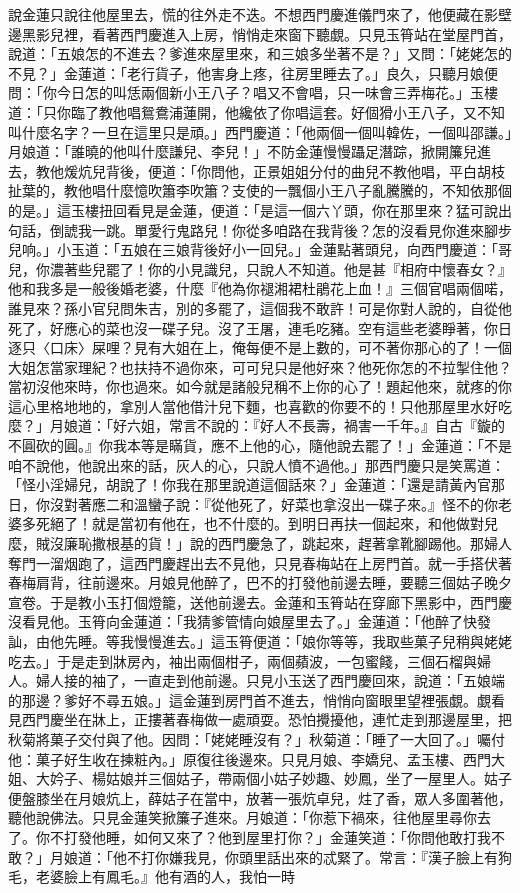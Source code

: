 說金蓮只說往他屋里去，慌的往外走不迭。不想西門慶進儀門來了，他便藏在影壁邊黑影兒裡，看著西門慶進入上房，悄悄走來窗下聽覷。只見玉筲站在堂屋門首，說道：「五娘怎的不進去？爹進來屋里來，和三娘多坐著不是？」又問：「姥姥怎的不見？」金蓮道：「老行貨子，他害身上疼，往房里睡去了。」良久，只聽月娘便問：「你今日怎的叫恁兩個新小王八子？唱又不會唱，只一味會三弄梅花。」玉樓道：「只你臨了教他唱鴛鴦浦蓮開，他纔依了你唱這套。好個猾小王八子，又不知叫什麼名字？一旦在這里只是頑。」西門慶道：「他兩個一個叫韓佐，一個叫邵謙。」月娘道：「誰曉的他叫什麼謙兒、李兒！」不防金蓮慢慢躡足潛踪，掀開簾兒進去，教他煖炕兒背後，便道：「你問他，正景姐姐分付的曲兒不教他唱，平白胡枝扯葉的，教他唱什麼憶吹簫李吹簫？支使的一飄個小王八子亂騰騰的，不知依那個的是。」這玉樓扭回看見是金蓮，便道：「是這一個六丫頭，你在那里來？猛可說出句話，倒諕我一跳。單愛行鬼路兒！你從多咱路在我背後？怎的沒看見你進來腳步兒响。」小玉道：「五娘在三娘背後好小一回兒。」金蓮點著頭兒，向西門慶道：「哥兒，你濃著些兒罷了！你的小見識兒，只說人不知道。他是甚『相府中懷春女？』他和我多是一般後婚老婆，什麼『他為你褪湘裙杜鵑花上血！』三個官唱兩個喏，誰見來？孫小官兒問朱吉，別的多罷了，這個我不敢許！可是你對人說的，自從他死了，好應心的菜也沒一碟子兒。沒了王屠，連毛吃豬。空有這些老婆睜著，你日逐只〈口床〉屎哩？見有大姐在上，俺每便不是上數的，可不著你那心的了！一個大姐怎當家理紀？也扶持不過你來，可可兒只是他好來？他死你怎的不拉掣住他？當初沒他來時，你也過來。如今就是諸般兒稱不上你的心了！題起他來，就疼的你這心里格地地的，拿別人當他借汁兒下麵，也喜歡的你要不的！只他那屋里水好吃麼？」月娘道：「好六姐，常言不說的：『好人不長壽，禍害一千年。』自古『鏇的不圓砍的圓。』你我本等是瞞貨，應不上他的心，隨他說去罷了！」金蓮道：「不是咱不說他，他說出來的話，灰人的心，只說人憤不過他。」那西門慶只是笑罵道：「怪小淫婦兒，胡說了！你我在那里說道這個話來？」金蓮道：「還是請黃內官那日，你沒對著應二和溫蠻子說：『從他死了，好菜也拿沒出一碟子來。』怪不的你老婆多死絕了！就是當初有他在，也不什麼的。到明日再扶一個起來，和他做對兒麼，賊沒廉恥撒根基的貨！」說的西門慶急了，跳起來，趕著拿靴腳踢他。那婦人奪門一溜烟跑了，這西門慶趕出去不見他，只見春梅站在上房門首。就一手搭伏著春梅肩背，往前邊來。月娘見他醉了，巴不的打發他前邊去睡，要聽三個姑子晚夕宣卷。于是教小玉打個燈籠，送他前邊去。金蓮和玉筲站在穿廊下黑影中，西門慶沒看見他。玉筲向金蓮道：「我猜爹管情向娘屋里去了。」金蓮道：「他醉了快發訕，由他先睡。等我慢慢進去。」這玉筲便道：「娘你等等，我取些菓子兒稍與姥姥吃去。」于是走到牀房內，袖出兩個柑子，兩個蘋波，一包蜜餞，三個石榴與婦人。婦人接的袖了，一直走到他前邊。只見小玉送了西門慶回來，說道：「五娘端的那邊？爹好不尋五娘。」這金蓮到房門首不進去，悄悄向窗眼里望裡張覷。覷看見西門慶坐在牀上，正摟著春梅做一處頑耍。恐怕攪擾他，連忙走到那邊屋里，把秋菊將菓子交付與了他。因問：「姥姥睡沒有？」秋菊道：「睡了一大回了。」囑付他：菓子好生收在揀粧內。」原復往後邊來。只見月娘、李嬌兒、孟玉樓、西門大姐、大妗子、楊姑娘并三個姑子，帶兩個小姑子妙趣、妙鳳，坐了一屋里人。姑子便盤膝坐在月娘炕上，薛姑子在當中，放著一張炕卓兒，炷了香，眾人多圍著他，聽他說佛法。只見金蓮笑掀簾子進來。月娘道：「你惹下禍來，往他屋里尋你去了。你不打發他睡，如何又來了？他到屋里打你？」金蓮笑道：「你問他敢打我不敢？」月娘道：「他不打你嫌我見，你頭里話出來的忒緊了。常言：『漢子臉上有狗毛，老婆臉上有鳳毛。』他有酒的人，我怕一時